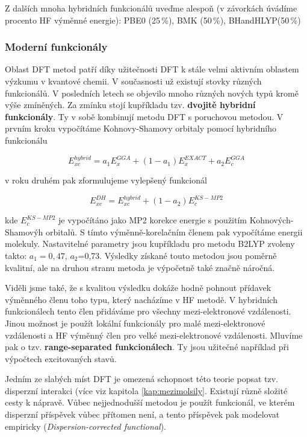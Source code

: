 Z dalších mnoha hybridních funkcionálů uveďme alespoň (v závorkách úvádíme procento HF výměnné energie): PBE0 (25\,\%), BMK (50\,\%), BHandHLYP(50\,\%)

\subsubsection{Moderní funkcionály}
Oblast DFT metod patří díky užitečnosti DFT k stále velmi aktivním oblastem výzkumu v kvantové chemii. V současnosti už existují stovky různých funkcionálů. V posledních letech se objevilo mnoho různých nových typů kromě výše zmíněných. Za zmínku stojí kupříkladu tzv. \textbf{dvojitě hybridní funkcionály}. Ty v sobě kombinují metodu DFT s poruchovou metodou. V prvním kroku vypočítáme Kohnovy-Shamovy orbitaly pomocí hybridního funkcionálu

\begin{equation}
E_{xc}^{hybrid}=a_1E_x^{GGA}+(1-a_1)E_x^{EXACT}+a_2E_c^{GGA}
\end{equation}

v roku druhém pak zformulujeme vylepšený funkcionál

\begin{equation}
E_{xc}^{DH}=E_{xc}^{hybrid}+(1-a_2)E_c^{KS-MP2}
\end{equation}

kde $E_c^{KS-MP2}$ je vypočítáno jako MP2 korekce energie s použitím Kohnových-Shamovýh orbitalů. S tímto výměnně-korelačním členem pak vypočítáme energii molekuly. Nastavitelné parametry jsou kupříkladu pro metodu B2LYP zvoleny takto: $a_1=0,47$, $a_2$=0,73.
Výsledky získané touto metodou jsou poměrně kvalitní, ale na druhou stranu metoda je výpočetně také značně náročná.

Viděli jsme také, že s kvalitou výsledku dokáže hodně pohnout přídavek výměnného členu toho typu, který nacházíme v HF metodě. V hybridních funkcionálech tento člen přidáváme pro všechny mezi-elektronové vzdálenosti. Jinou možnost je použít lokální funkcionály pro malé mezi-elektronové vzdálenosti a HF výměnný člen pro velké mezi-elektronové vzdálenosti. Mluvíme pak o tzv. \textbf{range-separated funkcionálech}. Ty jsou užitečné například při výpočtech excitovaných stavů. 

Jedním ze slabých míst DFT je omezená schopnost této teorie popsat tzv. disperzní interakci (více viz kapitola \ref{kap:mezimolsily}.
Existují různě složité cesty k nápravě. Vůbec nejjednodušší metodou je použít funkcionál, ve kterém disperzní příspěvek vůbec přítomen není, a tento příspěvek pak modelovat empiricky (\textit{Dispersion-corrected functional}).  

